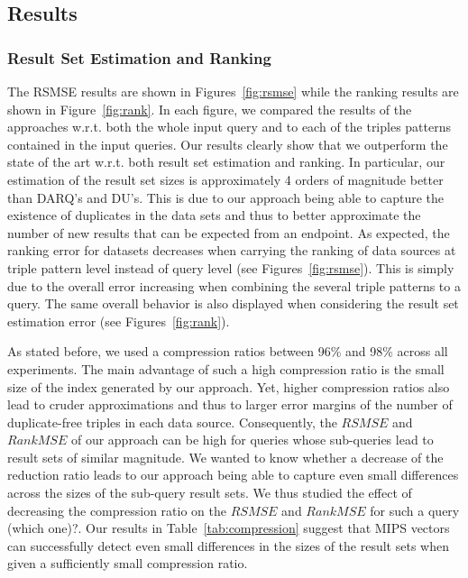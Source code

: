 \documentclass{sig-alternate}  %
\begin{document}
\subsection{Results}

\subsubsection{Result Set Estimation and Ranking}
The RSMSE results are shown in Figures~\ref{fig:rsmse} while the ranking results are shown in Figure~\ref{fig:rank}.
In each figure, we compared the results of the approaches w.r.t. both the whole input query and to each of the triples patterns contained in the input queries.
Our results clearly show that we outperform the state of the art w.r.t. both result set estimation and ranking.
In particular, our estimation of the result set sizes is approximately 4 orders of magnitude better than DARQ's and DU's. 
This is due to our approach being able to capture the existence of duplicates in the data sets and thus to better approximate the number of new results that can be expected from  an endpoint.
As expected, the ranking error for datasets decreases when carrying the ranking of data sources at triple pattern level instead of query level (see Figures~\ref{fig:rsmse}).
This is simply due to the overall error increasing when combining the several triple patterns to a query.
The same overall behavior is also displayed when considering the result set estimation error (see Figures~\ref{fig:rank}). 



As stated before, we used a compression ratios between 96\% and 98\% across all experiments. 
The main advantage of such a high compression ratio is the small size of the index generated by our approach. 
Yet, higher compression ratios also lead to cruder approximations and thus to larger error margins of the number of duplicate-free triples in each data source.
Consequently, the $RSMSE$ and $RankMSE$ of our approach can be high for queries whose sub-queries lead to result sets of similar magnitude.
We wanted to know whether a decrease of the reduction ratio leads to our approach being able to capture even small differences across the sizes of the sub-query result sets.
We thus studied the effect of decreasing the compression ratio on the $RSMSE$ and $RankMSE$ for such a query (which one)?.
Our results in Table~\ref{tab:compression} suggest that MIPS vectors can successfully detect even small differences in the sizes of the result sets when given a sufficiently small compression ratio.
\end{document}
